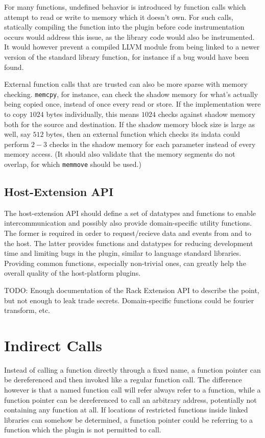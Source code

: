 For many functions, undefined behavior is introduced by function calls which
attempt to read or write to memory which it doesn't own. For such calls, 
statically compiling the function into the plugin before code instrumentation
occurs would address this issue, as the library code would also be instrumented.
It would however prevent a compiled LLVM module from being linked to a newer
version of the standard library function, for instance if a bug would have been
found.

External function calls that are trusted can also be more sparse with memory
checking. \texttt{memcpy}, for instance, can check the shadow memory for what's
actually being copied once, instead of once every read or store. If the
implementation were to copy $1024$ bytes individually, this means $1024$ checks
against shadow memory both for the source and destination. If the shadow memory
block size is large as well, say $512$ bytes, then an external function which
checks its indata could perform $2-3$ checks in the shadow memory for each
parameter instead of every memory access. (It should also validate that the
memory segments do not overlap, for which \texttt{memmove} should be used.)

\subsection {Host-Extension API}

The host-extension API should define a set of datatypes and functions to enable
intercommunication and possibly also provide domain-specific utility functions.
The former is required in order to request/recieve data and events from and to
the host. The latter provides functions and datatypes for reducing development
time and limiting bugs in the plugin, similar to language standard libraries.
Providing common functions, especially non-trivial ones, can greatly help the
overall quality of the host-platform plugins.

TODO: Enough documentation of the Rack Extension API to describe the point, but
not enough to leak trade secrets. Domain-specific functions could be fourier
transform, etc.


\section {Indirect Calls}

Instead of calling a function directly through a fixed name, a function pointer
can be dereferenced and then invoked like a regular function call. The
difference however is that a named function call will refer always refer to a
function, while a function pointer can be dereferenced to call an arbitrary
address, potentially not containing any function at all. If locations of
restricted functions inside linked libraries can somehow be determined, a
function pointer could be referring to a function which the plugin is not
permitted to call.

